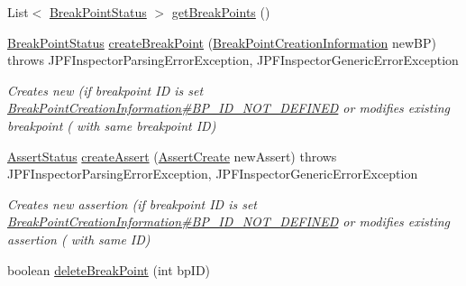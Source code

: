 \begin{DoxyCompactItemize}
\item 
List$<$ \hyperlink{interfacegov_1_1nasa_1_1jpf_1_1inspector_1_1interfaces_1_1_break_point_status}{Break\+Point\+Status} $>$ \hyperlink{interfacegov_1_1nasa_1_1jpf_1_1inspector_1_1interfaces_1_1_break_point_manager_interface_a172b70b66d0f8f6564111ee60efede2c}{get\+Break\+Points} ()
\item 
\hyperlink{interfacegov_1_1nasa_1_1jpf_1_1inspector_1_1interfaces_1_1_break_point_status}{Break\+Point\+Status} \hyperlink{interfacegov_1_1nasa_1_1jpf_1_1inspector_1_1interfaces_1_1_break_point_manager_interface_a9a11e594662011fd492b60b6cbb8ffbf}{create\+Break\+Point} (\hyperlink{interfacegov_1_1nasa_1_1jpf_1_1inspector_1_1interfaces_1_1_break_point_creation_information}{Break\+Point\+Creation\+Information} new\+BP)  throws J\+P\+F\+Inspector\+Parsing\+Error\+Exception, J\+P\+F\+Inspector\+Generic\+Error\+Exception
\begin{DoxyCompactList}\small\item\em Creates new (if breakpoint ID is set \hyperlink{interfacegov_1_1nasa_1_1jpf_1_1inspector_1_1interfaces_1_1_break_point_creation_information_a24626231e3744e59f505d0731d4ca9e1}{Break\+Point\+Creation\+Information\#\+B\+P\+\_\+\+I\+D\+\_\+\+N\+O\+T\+\_\+\+D\+E\+F\+I\+N\+ED} or modifies existing breakpoint ( with same breakpoint ID) \end{DoxyCompactList}\item 
\hyperlink{interfacegov_1_1nasa_1_1jpf_1_1inspector_1_1interfaces_1_1_assert_status}{Assert\+Status} \hyperlink{interfacegov_1_1nasa_1_1jpf_1_1inspector_1_1interfaces_1_1_break_point_manager_interface_a835295e3e429bd405ba3acec21f5193e}{create\+Assert} (\hyperlink{interfacegov_1_1nasa_1_1jpf_1_1inspector_1_1interfaces_1_1_assert_create}{Assert\+Create} new\+Assert)  throws J\+P\+F\+Inspector\+Parsing\+Error\+Exception, J\+P\+F\+Inspector\+Generic\+Error\+Exception
\begin{DoxyCompactList}\small\item\em Creates new assertion (if breakpoint ID is set \hyperlink{interfacegov_1_1nasa_1_1jpf_1_1inspector_1_1interfaces_1_1_break_point_creation_information_a24626231e3744e59f505d0731d4ca9e1}{Break\+Point\+Creation\+Information\#\+B\+P\+\_\+\+I\+D\+\_\+\+N\+O\+T\+\_\+\+D\+E\+F\+I\+N\+ED} or modifies existing assertion ( with same ID) \end{DoxyCompactList}\item 
boolean \hyperlink{interfacegov_1_1nasa_1_1jpf_1_1inspector_1_1interfaces_1_1_break_point_manager_interface_a1b117659c4230581c31e5c5448675bcd}{delete\+Break\+Point} (int bp\+ID)

\end{DoxyCompactItemize}
